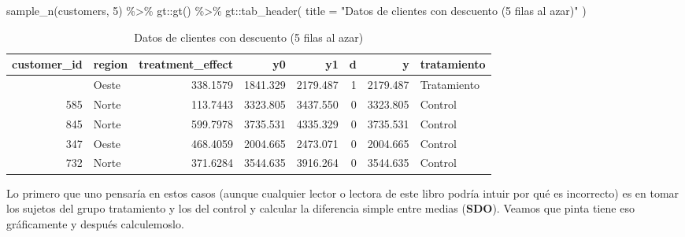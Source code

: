 \documentclass[
  letterpaper,
  DIV=11,
  numbers=noendperiod,
  oneside]{scrreprt}
\newenvironment{Shaded}{\begin{snugshade}}{\end{snugshade}}
\newcommand{\AttributeTok}[1]{\textcolor[rgb]{0.40,0.45,0.13}{#1}}
\newcommand{\DecValTok}[1]{\textcolor[rgb]{0.68,0.00,0.00}{#1}}
\newcommand{\FunctionTok}[1]{\textcolor[rgb]{0.28,0.35,0.67}{#1}}
\newcommand{\NormalTok}[1]{\textcolor[rgb]{0.00,0.23,0.31}{#1}}
\newcommand{\SpecialCharTok}[1]{\textcolor[rgb]{0.37,0.37,0.37}{#1}}
\newcommand{\StringTok}[1]{\textcolor[rgb]{0.13,0.47,0.30}{#1}}
\begin{document}
\begin{Shaded}
\begin{Highlighting}[]
\FunctionTok{sample\_n}\NormalTok{(customers, }\DecValTok{5}\NormalTok{) }\SpecialCharTok{\%\textgreater{}\%}
\NormalTok{  gt}\SpecialCharTok{::}\FunctionTok{gt}\NormalTok{() }\SpecialCharTok{\%\textgreater{}\%}
\NormalTok{  gt}\SpecialCharTok{::}\FunctionTok{tab\_header}\NormalTok{(}
    \AttributeTok{title =} \StringTok{"Datos de clientes con descuento (5 filas al azar)"}
\NormalTok{  )}
\end{Highlighting}
\end{Shaded}

\begin{table}
\caption*{
{\large Datos de clientes con descuento (5 filas al azar)}
} 
\fontsize{12.0pt}{14.4pt}\selectfont
\begin{tabular*}{\linewidth}{@{\extracolsep{\fill}}rlrrrrrl}
\toprule
customer\_id & region & treatment\_effect & y0 & y1 & d & y & tratamiento \\ 
\midrule\addlinespace[2.5pt]
241 & Oeste & 338.1579 & 1841.329 & 2179.487 & 1 & 2179.487 & Tratamiento \\ 
585 & Norte & 113.7443 & 3323.805 & 3437.550 & 0 & 3323.805 & Control \\ 
845 & Norte & 599.7978 & 3735.531 & 4335.329 & 0 & 3735.531 & Control \\ 
347 & Oeste & 468.4059 & 2004.665 & 2473.071 & 0 & 2004.665 & Control \\ 
732 & Norte & 371.6284 & 3544.635 & 3916.264 & 0 & 3544.635 & Control \\ 
\bottomrule
\end{tabular*}
\end{table}

Lo primero que uno pensaría en estos casos (aunque cualquier lector o
lectora de este libro podría intuir por qué es incorrecto) es en tomar
los sujetos del grupo tratamiento y los del control y calcular la
diferencia simple entre medias (\textbf{SDO}). Veamos que pinta tiene
eso gráficamente y después calculemoslo.
\end{document}

